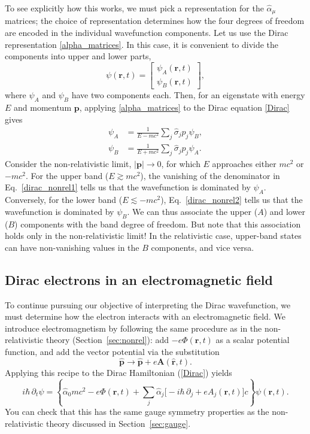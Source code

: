 \documentclass[pra,12pt]{revtex4}
\begin{document}
To see explicitly how this works, we must pick a representation for
the $\hat{\alpha}_\mu$ matrices; the choice of representation
determines how the four degrees of freedom are encoded in the
individual wavefunction components.  Let us use the Dirac
representation \eqref{alpha_matrices}.  In this case, it is convenient
to divide the components into upper and lower parts,
\begin{equation}
  \psi(\mathbf{r},t) = \begin{bmatrix}\psi_A(\mathbf{r},t)
    \\ \psi_B(\mathbf{r},t)
  \end{bmatrix},
\end{equation}
where $\psi_A$ and $\psi_B$ have two components each.  Then, for an
eigenstate with energy $E$ and momentum $\mathbf{p}$, applying
\eqref{alpha_matrices} to the Dirac equation \eqref{Dirac} gives
\begin{align}
  \psi_A &= \frac{1}{E - mc^2} \sum_j \hat{\sigma}_j p_j \psi_B,
  \label{dirac_nonrel1} \\
  \psi_B &= \frac{1}{E + mc^2} \sum_j \hat{\sigma}_j p_j \psi_A.
  \label{dirac_nonrel2}
\end{align}
Consider the non-relativistic limit, $|\mathbf{p}| \rightarrow 0$, for
which $E$ approaches either $mc^2$ or $-mc^2$.  For the upper band ($E
\gtrsim mc^2$), the vanishing of the denominator in
Eq.~\eqref{dirac_nonrel1} tells us that the wavefunction is dominated
by $\psi_A$.  Conversely, for the lower band ($E \lesssim -mc^2$),
Eq.~\eqref{dirac_nonrel2} tells us that the wavefunction is dominated
by $\psi_B$.  We can thus associate the upper ($A$) and lower ($B$)
components with the band degree of freedom.  But note that this
association holds only in the non-relativistic limit!  In the
relativistic case, upper-band states can have non-vanishing values in
the $B$ components, and vice versa.

\subsection{Dirac electrons in an electromagnetic field}
\label{sec:diracem}

To continue pursuing our objective of interpreting the Dirac
wavefunction, we must determine how the electron interacts with an
electromagnetic field.  We introduce electromagnetism by following the
same procedure as in the non-relativistic theory
(Section~\ref{sec:nonrel}): add $-e\Phi(\mathbf{r},t)$ as a scalar
potential function, and add the vector potential via the substitution
\begin{equation}
  \hat{\mathbf{p}} \rightarrow \hat{\mathbf{p}}
  + e\mathbf{A}(\hat{\mathbf{r}},t).  
\end{equation}
Applying this recipe to the Dirac Hamiltonian (\ref{Dirac}) yields
\begin{equation}
  i\hbar \, \partial_t \psi
  = \left\{\hat{\alpha}_0 mc^2 -e\Phi(\mathbf{r},t)
  + \sum_{j} \hat{\alpha}_j \Big[-i\hbar\,\partial_j
    +eA_j(\mathbf{r},t) \Big] c\right\}\psi(\mathbf{r},t).
  \label{DiracEM}
\end{equation}
You can check that this has the same gauge symmetry properties as the
non-relativistic theory discussed in Section~\ref{sec:gauge}.
\end{document}

